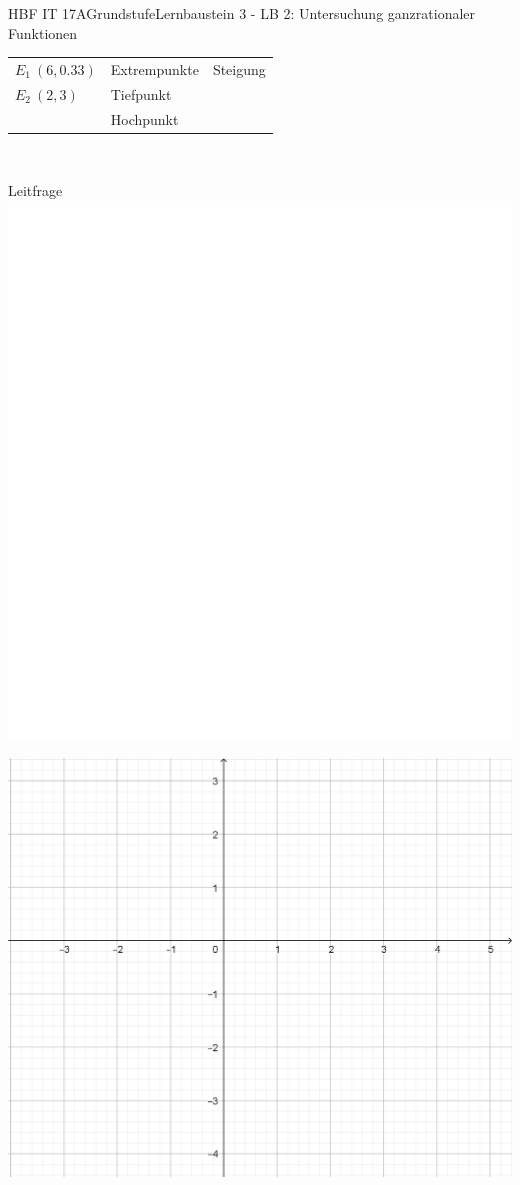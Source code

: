 \documentclass[oneside,openany,headings=optiontotoc,11pt,numbers=noenddot]{scrreprt}
\begin{document}
\begin{worksheet}{HBF IT 17A}{Grundstufe}{Lernbaustein 3 - LB 2: Untersuchung ganzrationaler Funktionen}
\begin{framed}
		\end{framed}
		\begin{framed}
			\noindent
			\begin{tabularx}{\textwidth}{XXX}
				\(E_1\ (6,0.33)\) & Extrempunkte & Steigung\\
				\(E_2\ (2,3)\) & Tiefpunkt & \\
				 & Hochpunkt\\
				\hline
			\end{tabularx}\\
			\par\noindent
			\tiny{\color{codegray}Leitfrage}\\
			\includegraphics[scale=0.15]{../empty.jpg}
		\end{framed}
		\newpage
		\begin{framed}
			\noindent
			\centering
			\includegraphics[scale=0.6]{Bilder/Koord_f.png}

\end{framed}
\end{worksheet}
\end{document}
